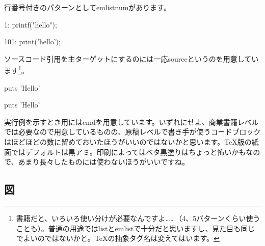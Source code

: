 行番号付きのパターンとしてemlistnumがあります。

\begin{reviewlistblock}
\begin{reviewemlist}
 1: printf("hello");
\end{reviewemlist}
\end{reviewlistblock}

\begin{reviewlistblock}
\begin{reviewemlist}
101: print('hello');
\end{reviewemlist}
\end{reviewlistblock}

ソースコード引用を主ターゲットにするのには一応sourceというのを用意しています\footnote{書籍だと、いろいろ使い分けが必要なんですよ……（4、5パターンくらい使うことも）。普通の用途ではlistとemlistで十分だと思いますし、見た目も同じでよいのではないかと。TeXの抽象タグ名は変えてはいます。}。

\begin{reviewlistblock}
\begin{reviewsource}
puts 'Hello'
\end{reviewsource}
\end{reviewlistblock}

\begin{reviewlistblock}
\begin{reviewsource}
puts 'Hello'
\end{reviewsource}
\end{reviewlistblock}

実行例を示すとき用にはcmdを用意しています。いずれにせよ、商業書籍レベルでは必要なので用意しているものの、原稿レベルで書き手が使うコードブロックはほどほどの数に留めておいたほうがいいのではないかと思います。TeX版の紙面ではデフォルトは黒アミ。印刷によってはベタ黒塗りはちょっと怖いかもなので、あまり長々したものには使わないほうがいいですね。

\begin{reviewlistblock}
\begin{reviewcmd}
\textdollar{} 
\end{reviewcmd}
\end{reviewlistblock}

\subsection{図}
\label{sec:2-1-2}

